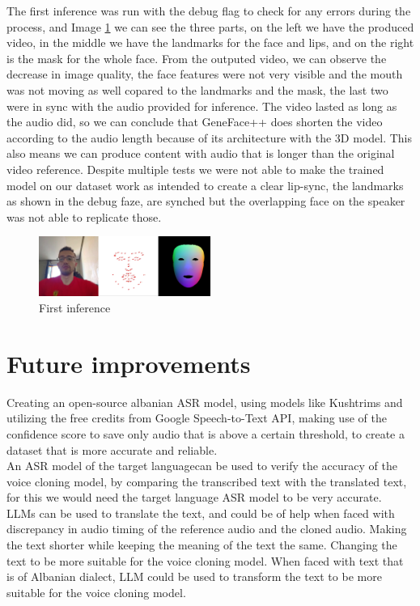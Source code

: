 \documentclass[12pt]{article}
\begin{document}
The first inference was run with the debug flag to check for any errors during the process, and Image \ref{img:first_inference} we can see the three parts, on the left we have the produced video, in the middle we have the landmarks for the face and lips, and on the right is the mask for the whole face. From the outputed video, we can observe the decrease in image quality, the face features were not very visible and the mouth was not moving as well copared to the landmarks and the mask, the last two were in sync with the audio provided for inference. The video lasted as long as the audio did, so we can conclude that GeneFace++ does shorten the video according to the audio length because of its architecture with the 3D model. This also means we can produce content with audio that is longer than the original video reference. Despite multiple tests we were not able to make the trained model on our dataset work as intended to create a clear lip-sync, the landmarks as shown in the debug faze, are synched but the overlapping face on the speaker was not able to replicate those. 

\begin{figure}[h!]
    \centering
    \includegraphics[width=0.5\textwidth]{images/first_inference.png}
    \caption{First inference}
    \label{img:first_inference}
\end{figure}



\section{Future improvements}
Creating an open-source albanian ASR model, using models like Kushtrims and utilizing the free credits from Google Speech-to-Text API, making use of the confidence score to save only audio that is above a certain threshold, to create a dataset that is more accurate and reliable.\\
An ASR model of the target languagecan be used to verify the accuracy of the voice cloning model, by comparing the transcribed text with the translated text, for this we would need the target language ASR model to be very accurate.\\
LLMs can be used to translate the text, and could be of help when faced with discrepancy in audio timing of the reference audio and the cloned audio. Making the text shorter while keeping the meaning of the text the same. Changing the text to be more suitable for the voice cloning model. When faced with text that is of Albanian dialect, LLM could be used to transform the text to be more suitable for the voice cloning model.\\
\end{document}
